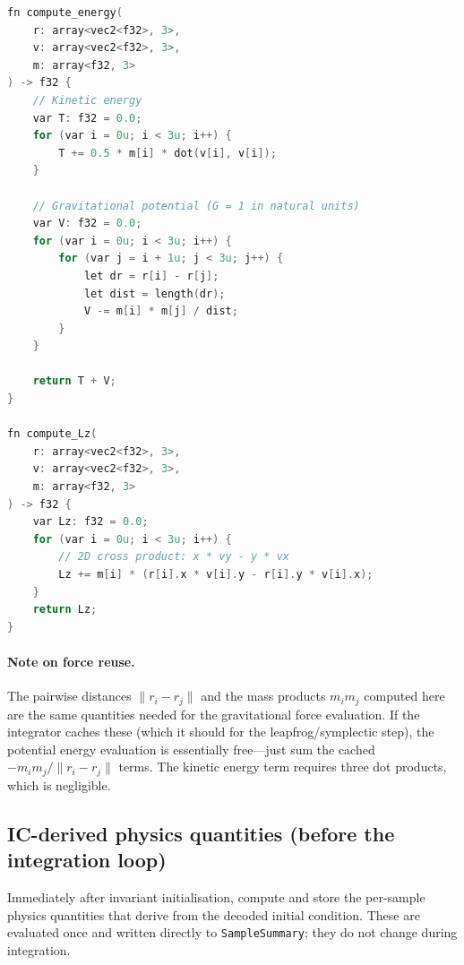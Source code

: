 \documentclass[11pt]{article}
\newcommand{\struct}[1]{\texttt{#1}}
\begin{document}
\begin{lstlisting}[language=C]
fn compute_energy(
    r: array<vec2<f32>, 3>,
    v: array<vec2<f32>, 3>,
    m: array<f32, 3>
) -> f32 {
    // Kinetic energy
    var T: f32 = 0.0;
    for (var i = 0u; i < 3u; i++) {
        T += 0.5 * m[i] * dot(v[i], v[i]);
    }

    // Gravitational potential (G = 1 in natural units)
    var V: f32 = 0.0;
    for (var i = 0u; i < 3u; i++) {
        for (var j = i + 1u; j < 3u; j++) {
            let dr = r[i] - r[j];
            let dist = length(dr);
            V -= m[i] * m[j] / dist;
        }
    }

    return T + V;
}

fn compute_Lz(
    r: array<vec2<f32>, 3>,
    v: array<vec2<f32>, 3>,
    m: array<f32, 3>
) -> f32 {
    var Lz: f32 = 0.0;
    for (var i = 0u; i < 3u; i++) {
        // 2D cross product: x * vy - y * vx
        Lz += m[i] * (r[i].x * v[i].y - r[i].y * v[i].x);
    }
    return Lz;
}
\end{lstlisting}

\paragraph{Note on force reuse.} The pairwise distances $\|r_i - r_j\|$ and
the mass products $m_i m_j$ computed here are the same quantities needed for the
gravitational force evaluation. If the integrator caches these (which it should
for the leapfrog/symplectic step), the potential energy evaluation is
essentially free---just sum the cached $-m_i m_j / \|r_i - r_j\|$ terms. The
kinetic energy term requires three dot products, which is negligible.

\subsection{IC-derived physics quantities (before the integration loop)}

Immediately after invariant initialisation, compute and store the per-sample
physics quantities that derive from the decoded initial condition. These are
evaluated once and written directly to \struct{SampleSummary}; they do not
change during integration.
\end{document}
